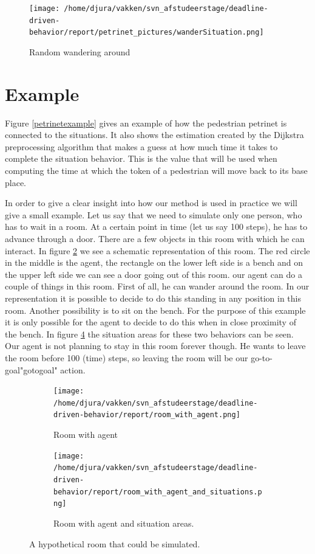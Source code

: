 \documentclass[11pt, a4paper]{book}
\begin{document}
\begin{figure}[h!]
\centering            
\texttt{[image: /home/djura/vakken/svn\_afstudeerstage/deadline-driven-behavior/report/petrinet\_pictures/wanderSituation.png]}
\caption{Random wandering around}
\label{fig:wanderpetrinet}
\end{figure}
\clearpage

\section{Example}
Figure \ref{petrinetexample} gives an example of how the pedestrian petrinet is connected to the situations. It also shows the estimation created by the Dijkstra preprocessing algorithm that makes a guess at how much time it takes to complete the situation behavior. This is the value that will be used when computing the time at which the token of a pedestrian will move back to its base place.

In order to give a clear insight into how our method is used in practice we will give a small example. Let us say that we need to simulate only one person, who has to wait in a room. At a certain point in time (let us say 100 steps), he has to advance through a door. There are a few objects in this room with which he can interact. In figure  \ref{fig:roomwithagent} we see a schematic representation of this room. The red circle in the middle is the agent, the rectangle on the lower left side is a bench and on the upper left side we can see a door going out of this room. our agent can do a couple of things in this room. First of all, he can wander around the room. In our representation it is possible to decide to do this standing in any position in this room. Another possibility is to sit on the bench. For the purpose of this example it is only possible for the agent to decide to do this when in close proximity of the bench. In figure \ref{fig:roomwithagentsituations} the situation areas for these two behaviors can be seen. Our agent is not planning to stay in this room forever though. He wants to leave the room before 100 (time) steps, so leaving the room will be our go-to-goal"gotogoal" action.

\begin{figure}
\centering
\begin{subfigure}[b]{0.5\textwidth}
\centering
\texttt{[image: /home/djura/vakken/svn\_afstudeerstage/deadline-driven-behavior/report/room\_with\_agent.png]}
\caption{Room with agent}
\label{fig:roomwithagent}
\end{subfigure}%
\begin{subfigure}[b]{0.5\textwidth}
\centering            
\texttt{[image: /home/djura/vakken/svn\_afstudeerstage/deadline-driven-behavior/report/room\_with\_agent\_and\_situations.png]}
\caption{Room with agent and situation areas.}
\label{fig:roomwithagentsituations}
\end{subfigure}
\caption{A hypothetical room that could be simulated.}
\end{figure}
\end{document}
